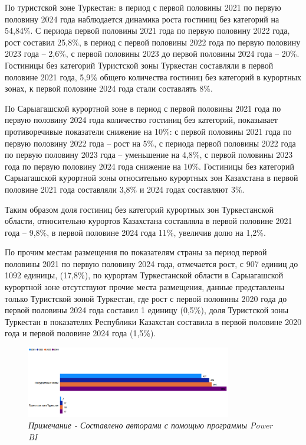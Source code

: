 \begin{multicols}{2}
По туристской зоне Туркестан: в период с первой половины 2021 по первую
половину 2024 года наблюдается динамика роста гостиниц без категорий на
54,84\%. С периода первой половины 2021 года по первую половину 2022
года, рост составил 25,8\%, в период с первой половины 2022 года по
первую половину 2023 года -- 2,6\%, с первой половины 2023 до первой
половины 2024 года -- 20\%. Гостиницы без категорий Туристской зоны
Туркестан составляли в первой половине 2021 года, 5,9\% общего
количества гостиниц без категорий в курортных зонах, к первой половине
2024 года стали составлять 8\%.

По Сарыагашской курортной зоне в период с первой половины 2021 года по
первую половину 2024 года количество гостиниц без категорий, показывает
противоречивые показатели снижение на 10\%: с первой половины 2021 года
по первую половину 2022 года -- рост на 5\%, с периода первой половины
2022 года по первую половину 2023 года -- уменьшение на 4,8\%, с первой
половины 2023 года по первую половину 2024 года снижение на 10\%.
Гостиницы без категорий Сарыагашской курортной зоны относительно
курортных зон Казахстана в первой половине 2021 года составляли 3,8\% и
2024 годах составляют 3\%.

Таким образом доля гостиниц без категорий курортных зон Туркестанской
области, относительно курортов Казахстана составляла в первой половине
2021 года -- 9,8\%, в первой половине 2024 года 11\%, увеличив долю на
1,2\%.

По прочим местам размещения по показателям страны за период первой
половины 2021 по первую половину 2024 года, отмечается рост, с 907
единиц до 1092 единицы, (17,8\%), по курортам Туркестанской области в
Сарыагашской курортной зоне отсутствуют прочие места размещения, данные
представлены только Туристской зоной Туркестан, где рост с первой
половины 2020 года до первой половины 2024 года составил 1 единицу
(0,5\%), доля Туристской зоны Туркестан в показателях Республики
Казахстан составила в первой половине 2020 года и первой половине 2024
года (1,5\%).
\end{multicols}

\begin{figure}[H]
	\centering
	\includegraphics[width=0.8\textwidth]{media/ekon/image4}
	\caption*{Рис.2 - Прочие места размещения, единицы}
	\caption*{\emph{Примечание - Составлено авторами с помощью программы Power BI}}
\end{figure}

